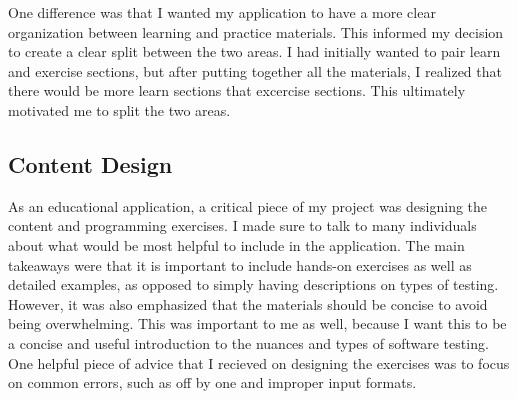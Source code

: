 \documentclass[10pt,twocolumn]{article}
\begin{document}
One difference was that I wanted my application to have a more clear organization between learning and practice materials.
This informed my decision to create a clear split between the two areas. I had initially wanted to pair learn and exercise 
sections, but after putting together all the materials, I realized that there would be 
more learn sections that excercise sections. This ultimately motivated me to split the two areas. 






\subsection{Content Design} 

As an educational application, a critical piece of my project was designing the content and programming exercises.
I made sure to talk to many individuals about what would be most helpful to include in the application.
The main takeaways were that it is important to include hands-on exercises as well as detailed 
examples, as opposed to simply having descriptions on types of testing. However, it was also emphasized that the materials should be concise to avoid being overwhelming. This was important 
to me as well, because I want this to be a concise and useful introduction to the nuances and types of software testing. 
One helpful piece of advice that I recieved on designing the exercises was to focus on common errors, such as off by one 
and improper input formats.
\end{document}
